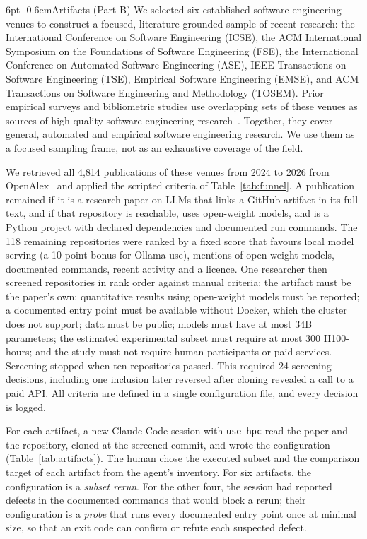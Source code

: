 \documentclass[pdflatex,sn-mathphys-num]{sn-jnl}
\makeatletter
\theoremstyle{thmstyletwo}%
\theoremstyle{thmstylethree}%
\newcommand{\tool}{\texttt{use-hpc}}
\renewcommand\paragraph{\@startsection{paragraph}{4}{\z@}%
  {6pt \@plus 2pt \@minus 1pt}{-0.6em}{\normalfont\normalsize\bfseries}}
\makeatother
\begin{document}
\paragraph{Artifacts (Part B)}
We selected six established software engineering venues to construct a focused, literature-grounded sample of recent research: the International Conference on Software Engineering (ICSE), the ACM International Symposium on the Foundations of Software Engineering (FSE), the International Conference on Automated Software Engineering (ASE), IEEE Transactions on Software Engineering (TSE), Empirical Software Engineering (EMSE), and ACM Transactions on Software Engineering and Methodology (TOSEM). Prior empirical surveys and bibliometric studies use overlapping sets of these venues as sources of high-quality software engineering research~\cite{silva2021topic,kapitsaki2026does}. Together, they cover general, automated and empirical software engineering research. We use them as a focused sampling frame, not as an exhaustive coverage of the field.

We retrieved all 4{,}814 publications of these venues from 2024 to 2026 from OpenAlex~\cite{priem2022openalex} and applied the scripted criteria of Table~\ref{tab:funnel}. A publication remained if it is a research paper on LLMs that links a GitHub artifact in its full text, and if that repository is reachable, uses open-weight models, and is a Python project with declared dependencies and documented run commands. The 118 remaining repositories were ranked by a fixed score that favours local model serving (a 10-point bonus for Ollama use), mentions of open-weight models, documented commands, recent activity and a licence. One researcher then screened repositories in rank order against manual criteria: the artifact must be the paper's own; quantitative results using open-weight models must be reported; a documented entry point must be available without Docker, which the cluster does not support; data must be public; models must have at most 34B parameters; the estimated experimental subset must require at most 300 H100-hours; and the study must not require human participants or paid services. Screening stopped when ten repositories passed. This required 24 screening decisions, including one inclusion later reversed after cloning revealed a call to a paid API. All criteria are defined in a single configuration file, and every decision is logged.


For each artifact, a new Claude Code session with \tool{} read the paper and the repository, cloned at the screened commit, and wrote the configuration (Table~\ref{tab:artifacts}). The human chose the executed subset and the comparison target of each artifact from the agent's inventory. For six artifacts, the configuration is a \emph{subset rerun}. For the other four, the session had reported defects in the documented commands that would block a rerun; their configuration is a \emph{probe} that runs every documented entry point once at minimal size, so that an exit code can confirm or refute each suspected defect.
\end{document}
